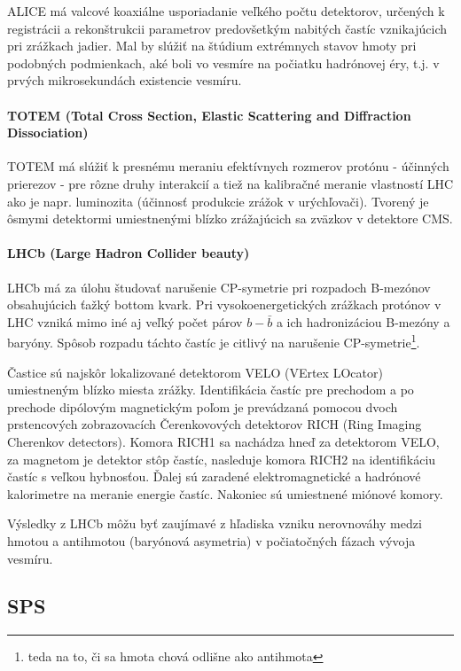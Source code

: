 \documentclass[../../main.tex]{subfiles}
\begin{document}
ALICE má valcové koaxiálne usporiadanie veľkého počtu detektorov, určených k registrácii a rekonštrukcii parametrov predovšetkým nabitých častíc vznikajúcich pri zrážkach jadier. Mal by slúžiť na štúdium extrémnych stavov hmoty pri podobných podmienkach, aké boli vo vesmíre na počiatku hadrónovej éry, t.j. v prvých mikrosekundách existencie vesmíru.

\paragraph{TOTEM (Total Cross Section, Elastic Scattering and Diffraction Dissociation)}

TOTEM má slúžiť k presnému meraniu efektívnych rozmerov protónu - účinných prierezov - pre rôzne druhy interakcií a tiež na kalibračné meranie vlastností LHC ako je napr. luminozita (účinnosť produkcie zrážok v urýchľovači). Tvorený je ôsmymi detektormi umiestnenými blízko zrážajúcich sa zväzkov v detektore CMS.

\paragraph{LHCb (Large Hadron Collider beauty)}

LHCb má za úlohu študovať narušenie CP-symetrie pri rozpadoch B-mezónov obsahujúcich ťažký bottom kvark. Pri vysokoenergetických zrážkach protónov v LHC vzniká mimo iné aj veľký počet párov $b-\bar{b}$ a ich hadronizáciou B-mezóny a baryóny. Spôsob rozpadu táchto častíc je citlivý na narušenie CP-symetrie\footnote{teda na to, či sa hmota chová odlišne ako antihmota}.

Častice sú najskôr lokalizované detektorom VELO (VErtex LOcator) umiestneným blízko miesta zrážky. Identifikácia častíc pre prechodom a po prechode dipólovým magnetickým poľom je prevádzaná pomocou dvoch prstencových zobrazovacích Čerenkovových detektorov RICH (Ring Imaging Cherenkov detectors). Komora RICH1 sa nachádza hneď za detektorom VELO, za magnetom je detektor stôp častíc, nasleduje komora RICH2 na identifikáciu častíc s veľkou hybnosťou. Ďalej sú zaradené elektromagnetické a hadrónové kalorimetre na meranie energie častíc. Nakoniec sú umiestnené miónové komory.

Výsledky z LHCb môžu byť zaujímavé z hľadiska vzniku nerovnováhy medzi hmotou a antihmotou (baryónová asymetria) v počiatočných fázach vývoja vesmíru.

\subsection{SPS}
\end{document}
